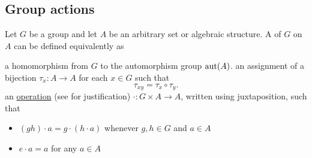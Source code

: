 \subsection{Group actions}\label{subsec:group_actions}

\begin{Definition}\label{def:left_group_action}\cite[159]{Knapp2016BAlg}
  Let \( G \) be a group and let \( A \) be an arbitrary set or algebraic structure. A  of \( G \) on \( A \) can be defined equivalently as
  \begin{DefEnum}
     a homomorphism from \( G \) to the automorphism group \( \operatorname{aut}(A) \).
     an assignment of a bijection \( \tau_x: A \to A \) for each \( x \in G \) such that
    \begin{equation*}
      \tau_{xy} = \tau_x \circ \tau_y.
    \end{equation*}
     an \hyperref[def:algebraic_theory]{operation} (see  for justification) \( \cdot: G \times A \to A \), written using juxtaposition, such that
    \begin{itemize}
      \item \( (g h) \cdot a = g \cdot (h \cdot a) \) whenever \( g, h \in G \) and \( a \in A \)
      \item \( e \cdot a = a \) for any \( a \in A \)
    \end{itemize}
  \end{DefEnum}
\end{Definition}
